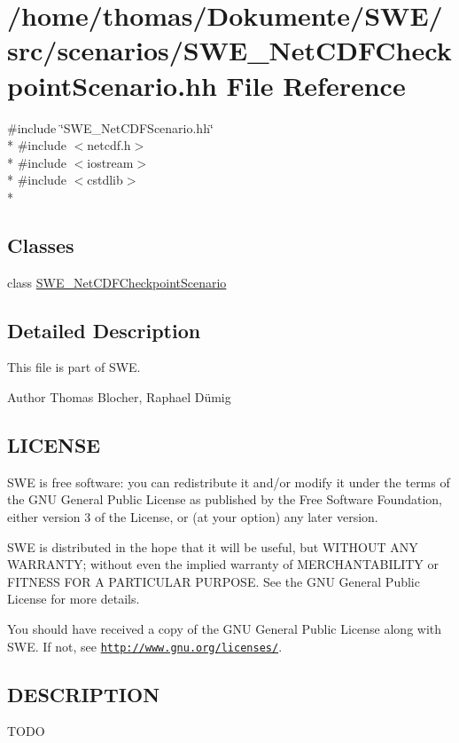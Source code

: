 \hypertarget{SWE__NetCDFCheckpointScenario_8hh}{\section{/home/thomas/\-Dokumente/\-S\-W\-E/src/scenarios/\-S\-W\-E\-\_\-\-Net\-C\-D\-F\-Checkpoint\-Scenario.hh File Reference}
\label{SWE__NetCDFCheckpointScenario_8hh}
}
{\ttfamily \#include \char`\"{}S\-W\-E\-\_\-\-Net\-C\-D\-F\-Scenario.\-hh\char`\"{}}\\*
{\ttfamily \#include $<$netcdf.\-h$>$}\\*
{\ttfamily \#include $<$iostream$>$}\\*
{\ttfamily \#include $<$cstdlib$>$}\\*
\subsection*{Classes}
\begin{DoxyCompactItemize}
\item 
class \hyperlink{classSWE__NetCDFCheckpointScenario}{S\-W\-E\-\_\-\-Net\-C\-D\-F\-Checkpoint\-Scenario}
\end{DoxyCompactItemize}


\subsection{Detailed Description}
This file is part of S\-W\-E.

\begin{DoxyAuthor}{Author}
Thomas Blocher, Raphael Dümig
\end{DoxyAuthor}
\hypertarget{Writer_8hh_LICENSE}{}\subsection{L\-I\-C\-E\-N\-S\-E}\label{Writer_8hh_LICENSE}
S\-W\-E is free software\-: you can redistribute it and/or modify it under the terms of the G\-N\-U General Public License as published by the Free Software Foundation, either version 3 of the License, or (at your option) any later version.

S\-W\-E is distributed in the hope that it will be useful, but W\-I\-T\-H\-O\-U\-T A\-N\-Y W\-A\-R\-R\-A\-N\-T\-Y; without even the implied warranty of M\-E\-R\-C\-H\-A\-N\-T\-A\-B\-I\-L\-I\-T\-Y or F\-I\-T\-N\-E\-S\-S F\-O\-R A P\-A\-R\-T\-I\-C\-U\-L\-A\-R P\-U\-R\-P\-O\-S\-E. See the G\-N\-U General Public License for more details.

You should have received a copy of the G\-N\-U General Public License along with S\-W\-E. If not, see \href{http://www.gnu.org/licenses/}{\tt http\-://www.\-gnu.\-org/licenses/}.\hypertarget{NetCdfWriter_8hh_DESCRIPTION}{}\subsection{D\-E\-S\-C\-R\-I\-P\-T\-I\-O\-N}\label{NetCdfWriter_8hh_DESCRIPTION}
T\-O\-D\-O 